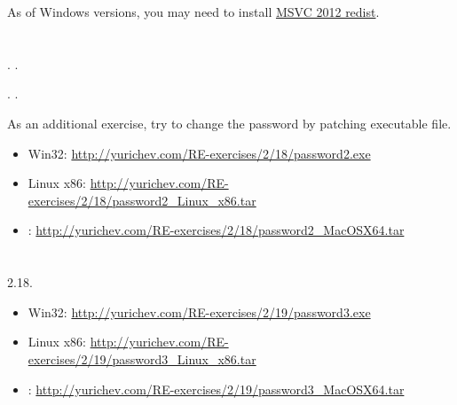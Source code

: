 {As of Windows versions, you may need to install} 
\href{http://www.microsoft.com/en-us/download/details.aspx?id=30679}{MSVC 2012 redist}.

\section{}

.
.

. 
.

{As an additional exercise, try to change the password by patching executable file}.

\begin{itemize}
\item Win32: \url{http://yurichev.com/RE-exercises/2/18/password2.exe}
\item Linux x86: \url{http://yurichev.com/RE-exercises/2/18/password2_Linux_x86.tar}
\item \MacOSX: \url{http://yurichev.com/RE-exercises/2/18/password2_MacOSX64.tar}
\end{itemize}

\section{}

 2.18.

\begin{itemize}
\item Win32: \url{http://yurichev.com/RE-exercises/2/19/password3.exe}
\item Linux x86: \url{http://yurichev.com/RE-exercises/2/19/password3_Linux_x86.tar}
\item \MacOSX: \url{http://yurichev.com/RE-exercises/2/19/password3_MacOSX64.tar}
\end{itemize}

